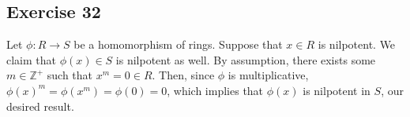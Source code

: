 \subsection*{Exercise 32}
Let $\phi: R \rightarrow S$ be a homomorphism of rings. Suppose that $x \in R$ is nilpotent. We claim that $\phi(x) \in S$ is nilpotent as well. By assumption, there exists some $m \in \mathbb{Z}^+$ such that $x^m = 0 \in R$. Then, since $\phi$ is multiplicative, $\phi(x)^m = \phi(x^m) = \phi(0) = 0$, which implies that $\phi(x)$ is nilpotent in $S$, our desired result.